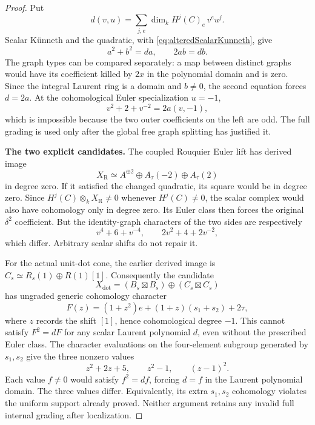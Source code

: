 \begin{proof}
Put
\[
 d(v,u)=\sum_{j,e}\dim_kH^j(C)_e\,v^e u^j.
\]
Scalar K\"unneth and the quadratic, with
\eqref{eq:alteredScalarKunneth}, give
\begin{equation}\label{eq:alteredScalarMultiplicityEquations}
                     a^2+b^2=da,\qquad 2ab=db.
\end{equation}
The graph types can be compared separately: a map
between distinct graphs would have its coefficient
killed by \(2x\) in the polynomial domain and is zero.
Since the integral Laurent ring is a domain and
\(b\ne0\), the second equation forces \(d=2a\).
At the cohomological Euler specialization \(u=-1\),
\[
                   v^2+2+v^{-2}=2a(v,-1),
\]
which is impossible because the two outer coefficients
on the left are odd. The full grading is used only
after the global free graph splitting has justified it.

\par\smallskip\noindent\textbf{The two explicit candidates.}\quad
The coupled Rouquier Euler lift has derived image
\[
 X_{\mathrm R}\simeq A^{\oplus2}
                      \oplus A_\tau(-2)\oplus A_\tau(2)
\]
in degree zero. If it satisfied the changed quadratic,
its square would be in degree zero. Since
\(H^j(C)\otimes_kX_{\mathrm R}\ne0\) whenever
\(H^j(C)\ne0\), the scalar complex would also have
cohomology only in degree zero. Its Euler class then
forces the original \(\delta^2\) coefficient.
But the identity-graph characters of the two sides are
respectively
\[
                  v^4+6+v^{-4},\qquad
                  2v^2+4+2v^{-2},
\]
which differ. Arbitrary scalar shifts do not repair it.

For the actual unit-dot cone, the earlier derived image
is \(C_s\simeq R_s(1)\oplus R(1)[1]\).
Consequently the candidate
\[
 X_{\mathrm{dot}}=(B_s\boxtimes B_s)
                       \oplus(C_s\boxtimes C_s)
\]
has ungraded generic cohomology character
\begin{equation}\label{eq:alteredScalarDotCharacter}
 F(z)=(1+z^2)e+(1+z)(s_1+s_2)+2\tau,
\end{equation}
where \(z\) records the shift \([1]\), hence
cohomological degree \(-1\). This cannot satisfy
\(F^2=dF\) for any scalar Laurent polynomial \(d\),
even without the prescribed Euler class.
The character evaluations on the four-element subgroup
generated by \(s_1,s_2\) give the three nonzero values
\[
                    z^2+2z+5,\qquad z^2-1,\qquad (z-1)^2.
\]
Each value \(f\ne0\) would satisfy \(f^2=df\),
forcing \(d=f\) in the Laurent polynomial domain.
The three values differ. Equivalently, its extra
\(s_1,s_2\) cohomology violates the uniform support
already proved. Neither argument retains any invalid
full internal grading after localization.
\end{proof}

